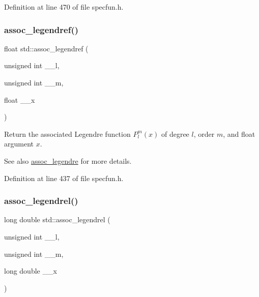 Definition at line 470 of file specfun.\+h.

\mbox{\label{group__tr29124__math__spec__func_ga3ced07ddd24bf4af56e2712d148e7f57}} 
\subsubsection{\texorpdfstring{assoc\+\_\+legendref()}{assoc\_legendref()}}
{\footnotesize\ttfamily float std\+::assoc\+\_\+legendref (\begin{DoxyParamCaption}\item[{unsigned int}]{\+\_\+\+\_\+l,  }\item[{unsigned int}]{\+\_\+\+\_\+m,  }\item[{float}]{\+\_\+\+\_\+x }\end{DoxyParamCaption})\hspace{0.3cm}{\ttfamily [inline]}}

Return the associated Legendre function $ P_l^m(x) $ of degree $ l $, order $ m $, and {\ttfamily float} argument $ x $.

\begin{DoxySeeAlso}{See also}
\hyperlink{group__tr29124__math__spec__func_ga7aa4182446f687094b12688078517d53}{assoc\+\_\+legendre} for more details. 
\end{DoxySeeAlso}


Definition at line 437 of file specfun.\+h.

\mbox{\label{group__tr29124__math__spec__func_ga55977b425a539146f060dec1c8003344}} 
\subsubsection{\texorpdfstring{assoc\+\_\+legendrel()}{assoc\_legendrel()}}
{\footnotesize\ttfamily long double std\+::assoc\+\_\+legendrel (\begin{DoxyParamCaption}\item[{unsigned int}]{\+\_\+\+\_\+l,  }\item[{unsigned int}]{\+\_\+\+\_\+m,  }\item[{long double}]{\+\_\+\+\_\+x }\end{DoxyParamCaption})\hspace{0.3cm}{\ttfamily [inline]}}

